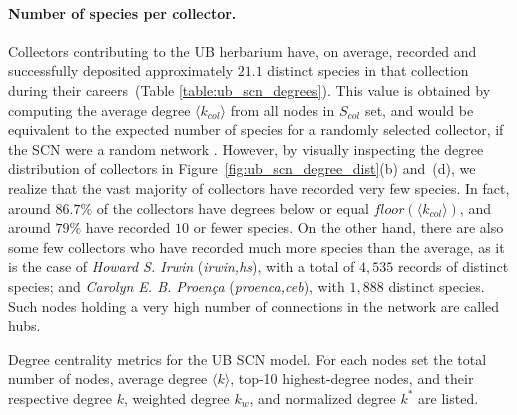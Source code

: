 \paragraph{Number of species per collector.}
Collectors contributing to the UB herbarium have, on average, recorded and successfully deposited approximately $21.1$ distinct species in that collection during their careers~(Table \ref{table:ub_scn_degrees}). This value is obtained by computing the average degree $\langle k_{col} \rangle$ from all nodes in $S_{col}$ set, and would be equivalent to the expected number of species for a randomly selected collector, if the SCN were a random network \cite{Albert2002}.
However, by visually inspecting the degree distribution of collectors in Figure~\ref{fig:ub_scn_degree_dist}(b) and~(d), we realize that the vast majority of collectors have recorded very few species. In fact, around $86.7\%$ of the collectors have degrees below or equal $floor(\langle k_{col} \rangle)$, and around $79\%$ have recorded $10$ or fewer species.
On the other hand, there are also some few collectors who have recorded much more species than the average, as it is the case of \textit{Howard S. Irwin} (\textit{irwin,hs}), with a total of $4,535$ records of distinct species; and \textit{Carolyn E. B. Proença} (\textit{proenca,ceb}), with $1,888$ distinct species. Such nodes holding a very high number of connections in the network are called hubs.

\begin{table}[t]
\caption[Degree centrality metrics for the UB SCN model.]{ Degree centrality metrics for the UB SCN model. For each nodes set the total number of nodes, average degree $\langle k \rangle$, top-10 highest-degree nodes, and their respective degree $k$, weighted degree $k_w$, and normalized degree $k^*$ are listed.}
\begin{center}
	
\end{center}
\label{table:ub_scn_degrees}
\end{table}

